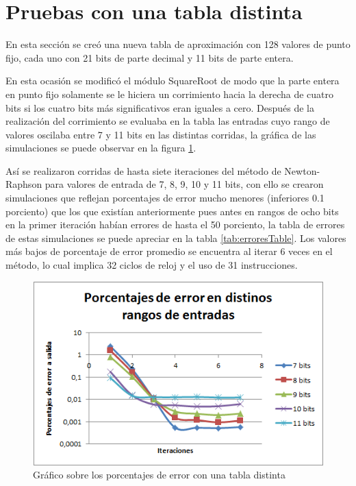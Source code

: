 \section{Pruebas con una tabla distinta}

En esta sección se creó una nueva tabla de aproximación con 128 valores de punto fijo, cada uno con 21 bits de parte decimal y 11 bits de parte entera.  

En esta ocasión se modificó el módulo SquareRoot de modo que la parte entera en punto fijo solamente se le hiciera un corrimiento hacia la derecha de cuatro bits si los cuatro bits más significativos eran iguales a cero. Después de la realización del corrimiento se evaluaba en la tabla las entradas cuyo rango de valores oscilaba entre 7 y 11 bits en las distintas corridas, la gráfica de las simulaciones se puede observar en la figura \ref{fig:puntos2}.

Así se realizaron corridas de hasta siete iteraciones del método de Newton-Raphson para valores de entrada de 7, 8, 9, 10 y 11 bits, con ello se crearon simulaciones que reflejan porcentajes de error mucho menores (inferiores 0.1 porciento) que los que existían anteriormente pues antes en rangos de ocho bits en la primer iteración habían errores de hasta el 50 porciento, la tabla de errores de estas simulaciones se puede apreciar en la tabla \ref{tab:erroresTable}. Los valores más bajos de porcentaje de error promedio se encuentra al iterar 6 veces en el método, lo cual implica 32 ciclos de reloj y el uso de 31 instrucciones. 

\begin{figure}
	\includegraphics[width=0.7\linewidth]{images/puntos2}
	\caption{Gráfico sobre los porcentajes de error con una tabla distinta} \label{fig:puntos2}
\end{figure}

